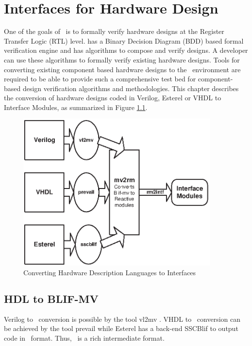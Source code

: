 \chapter{Interfaces for Hardware Design}
One of the goals of \chai \ is to formally verify hardware designs
at the Register Transfer Logic (RTL) level. {\chai} has a Binary
Decision Diagram (BDD) based formal verification engine and has
algorithms to compose and verify designs. A developer can use
these algorithms to formally verify existing hardware designs.
Tools for converting existing component based hardware designs to
the \chai \ environment are required to be able to provide such a
comprehensive test bed for component-based design verification
algorithms and methodologies. This chapter describes the
conversion of hardware designs coded in Verilog, Esterel or VHDL
to Interface Modules, as summarized in Figure \ref{fig:hdl2intf}.

\begin{figure}[htbp]
\centering
\includegraphics[width=4in]{figs/hdl2intf}
\caption{Converting Hardware Description Languages to Interfaces}
\label{fig:hdl2intf}
\end{figure}

\section{HDL to BLIF-MV}
Verilog to \mv \ conversion is possible by the tool vl2mv
\cite{vl2mv}. VHDL to \mv \ conversion can be achieved by the tool
prevail \cite{PREVAIL} while Esterel has a back-end SSCBlif
\cite{sscblif} to output code in \mv \ format. Thus, \mv \ is a
rich intermediate format.

